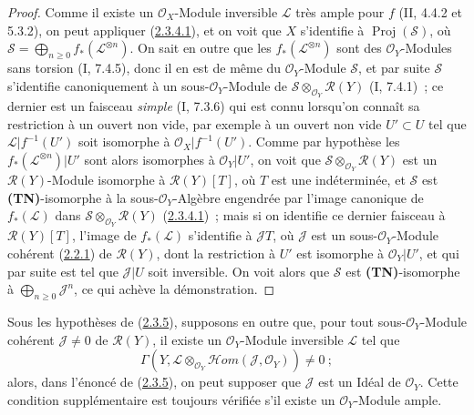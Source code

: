 \begin{proof}
Comme il existe un $\mathcal O_X$-Module inversible $\mathcal L$ très
ample pour $f$ (II, 4.4.2 et 5.3.2), on peut appliquer
(\hyperref[III.2.3.4.1-fr]{2.3.4.1}), et on voit que $X$ s'identifie à
$\operatorname{Proj}(\mathcal S)$, où
$\mathcal S=\bigoplus_{n\geq0}f_*(\mathcal L^{\otimes n})$. On sait en
outre que les $f_*(\mathcal L^{\otimes n})$ sont des
$\mathcal O_Y$-Modules sans torsion (I, 7.4.5), donc il en est de même du
$\mathcal O_Y$-Module $\mathcal S$, et par suite $\mathcal S$ s'identifie
canoniquement à un sous-$\mathcal O_Y$-Module de
$\mathcal S\otimes_{\mathcal O_Y}\mathcal R(Y)$ (I, 7.4.1)~; ce dernier
est un faisceau \emph{simple} (I, 7.3.6) qui est connu lorsqu'on connaît
sa restriction à un ouvert non vide, par exemple à un ouvert non vide
$U'\subset U$ tel que $\mathcal L|f^{-1}(U')$ soit isomorphe à
$\mathcal O_X|f^{-1}(U')$. Comme par hypothèse les
$f_*(\mathcal L^{\otimes n})|U'$ sont alors isomorphes à
$\mathcal O_Y|U'$, on voit que
$\mathcal S\otimes_{\mathcal O_Y}\mathcal R(Y)$ est un
$\mathcal R(Y)$-Module isomorphe à $\mathcal R(Y)[T]$, où $T$ est une
indéterminée, et $\mathcal S$ est \textbf{(TN)}-isomorphe à la
sous-$\mathcal O_Y$-Algèbre engendrée par l'image canonique de
$f_*(\mathcal L)$ dans $\mathcal S\otimes_{\mathcal O_Y}\mathcal R(Y)$
(\hyperref[III.2.3.4.1-fr]{2.3.4.1})~; mais si on identifie ce dernier
faisceau à $\mathcal R(Y)[T]$, l'image de $f_*(\mathcal L)$ s'identifie à
$\mathcal J T$, où $\mathcal J$ est un sous-$\mathcal O_Y$-Module
cohérent (\hyperref[III.2.2.1-fr]{2.2.1}) de $\mathcal R(Y)$, dont la
restriction à $U'$ est isomorphe à $\mathcal O_Y|U'$, et qui par suite
est tel que $\mathcal J|U$ soit inversible. On voit alors que $\mathcal S$
est \textbf{(TN)}-isomorphe à $\bigoplus_{n\geq0}\mathcal J^n$, ce qui
achève la démonstration.
\end{proof}

\begin{corollary}[2.3.6]
\label{III.2.3.6-fr}
Sous les hypothèses de (\hyperref[III.2.3.5-fr]{2.3.5}), supposons en
outre que, pour tout sous-$\mathcal O_Y$-Module cohérent
$\mathcal J\neq0$ de $\mathcal R(Y)$, il existe un
$\mathcal O_Y$-Module inversible $\mathcal L$ tel que
\[
\Gamma(Y,\mathcal L\otimes_{\mathcal O_Y}
\mathcal{H}om(\mathcal J,\mathcal O_Y))\neq0~;
\]
alors, dans l'énoncé de (\hyperref[III.2.3.5-fr]{2.3.5}), on peut supposer
que $\mathcal J$ est un Idéal de $\mathcal O_Y$. Cette condition
supplémentaire est toujours vérifiée s'il existe un
$\mathcal O_Y$-Module ample.
\end{corollary}

